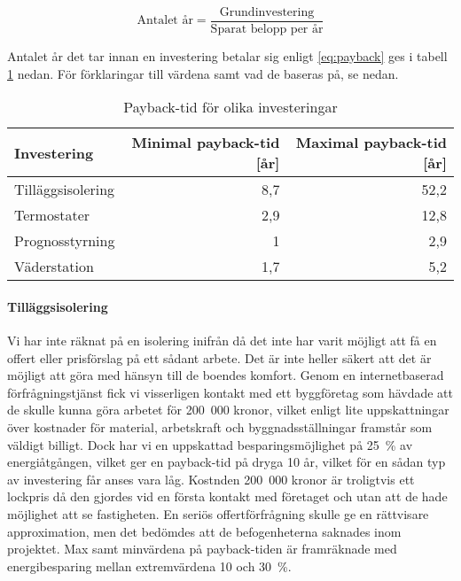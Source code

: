 \begin{equation} \label{eq:payback}
\text{Antalet år}=\frac{\text{Grundinvestering}}{\text{Sparat belopp per år}}
\end{equation}

Antalet år det tar innan en investering betalar sig enligt \eqref{eq:payback} ges i tabell \ref{tbl:payback} nedan. För förklaringar till värdena samt vad de baseras på, se nedan.

\begin{table}[hbtp]
\centering
\caption{Payback-tid för olika investeringar}
\label{tbl:payback}

\begin{tabular}
{|l|r|r|}
\hline
\textbf{Investering} & \textbf{Minimal payback-tid [år]} &{\textbf{Maximal payback-tid [år]}} \\
\hline
Tilläggsisolering & 8,7 & 52,2 \\
\hline
Termostater & 2,9 & 12,8 \\
\hline
Prognosstyrning &  1 & 2,9 \\ 
\hline
Väderstation & 1,7 & 5,2 \\
\hline

\end{tabular}
\end{table}

\paragraph{Tilläggsisolering}
Vi har inte räknat på en isolering inifrån då det inte har varit möjligt att få en offert eller prisförslag på ett sådant arbete. Det är inte heller säkert att det är möjligt att göra med hänsyn till de boendes komfort. Genom en internetbaserad förfrågningstjänst fick vi visserligen kontakt med ett byggföretag som hävdade att de skulle kunna göra arbetet för 200~000 kronor, vilket enligt lite uppskattningar över kostnader för material, arbetskraft och byggnadsställningar framstår som väldigt billigt. Dock har vi en uppskattad besparingsmöjlighet på 25~\% av energiåtgången, vilket ger en payback-tid på dryga 10 år, vilket för en sådan typ av investering får anses vara låg. Kostnden 200~000 kronor är troligtvis ett lockpris då den gjordes vid en första kontakt med företaget och utan att de hade möjlighet att se fastigheten. En seriös offertförfrågning skulle ge en rättvisare approximation, men det bedömdes att de befogenheterna saknades inom projektet. Max samt minvärdena på payback-tiden är framräknade med energibesparing mellan extremvärdena 10 och 30~\%.

